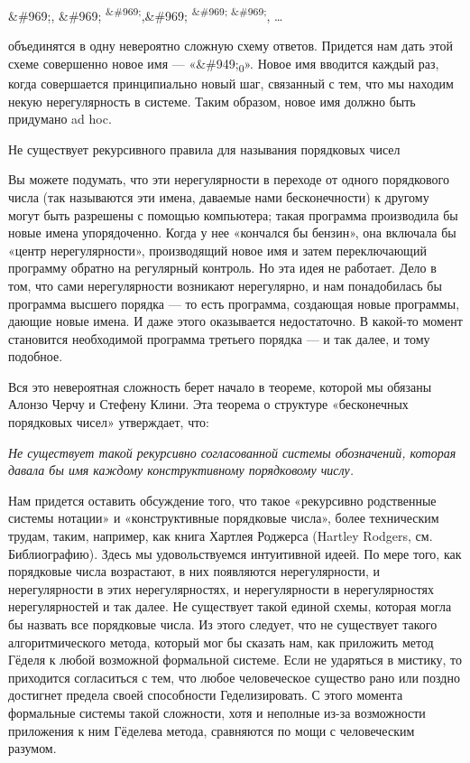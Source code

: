 \&\#969;, \&\#969; \textsuperscript{\&\#969;},\&\#969; \textsuperscript{\&\#969; \&\#969;}, \ldots{}

объединятся в одну невероятно сложную схему ответов. Придется нам дать этой схеме совершенно новое имя --- «\&\#949;\textsubscript{0}». Новое имя вводится каждый раз, когда совершается принципиально новый шаг, связанный с тем, что мы находим некую нерегулярность в системе. Таким образом, новое имя должно быть придумано ad hoc.

Не существует рекурсивного правила для называния порядковых чисел

Вы можете подумать, что эти нерегулярности в переходе от одного порядкового числа (так называются эти имена, даваемые нами бесконечности) к другому могут быть разрешены с помощью компьютера; такая программа производила бы новые имена упорядоченно. Когда у нее «кончался бы бензин», она включала бы «центр нерегулярности», производящий новое имя и затем переключающий программу обратно на регулярный контроль. Но эта идея не работает. Дело в том, что сами нерегулярности возникают нерегулярно, и нам понадобилась бы программа высшего порядка --- то есть программа, создающая новые программы, дающие новые имена. И даже этого оказывается недостаточно. В какой-то момент становится необходимой программа третьего порядка --- и так далее, и тому подобное.

Вся это невероятная сложность берет начало в теореме, которой мы обязаны Алонзо Черчу и Стефену Клини. Эта теорема о структуре «бесконечных порядковых чисел» утверждает, что:

\emph{Не существует такой рекурсивно согласованной системы обозначений, которая давала бы имя каждому конструктивному порядковому числу.}

Нам придется оставить обсуждение того, что такое «рекурсивно родственные системы нотации» и «конструктивные порядковые числа», более техническим трудам, таким, например, как книга Хартлея Роджерса (Hartley Rodgers, см. Библиографию). Здесь мы удовольствуемся интуитивной идеей. По мере того, как порядковые числа возрастают, в них появляются нерегулярности, и нерегулярности в этих нерегулярностях, и нерегулярности в нерегулярностях нерегулярностей и так далее. Не существует такой единой схемы, которая могла бы назвать все порядковые числа. Из этого следует, что не существует такого алгоритмического метода, который мог бы сказать нам, как приложить метод Гёделя к любой возможной формальной системе. Если не ударяться в мистику, то приходится согласиться с тем, что любое человеческое существо рано или поздно достигнет предела своей способности Геделизировать. С этого момента формальные системы такой сложности, хотя и неполные из-за возможности приложения к ним Гёделева метода, сравняются по мощи с человеческим разумом.

